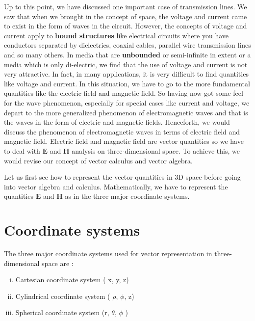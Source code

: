 Up to this point, we have discussed one important case of transmission lines. We saw that when we brought in the concept of space, the voltage and current came to exist in the form of waves in the circuit. However, the concepts of voltage and current apply to \textbf{bound structures} like electrical circuits where you have conductors separated by dielectrics, coaxial cables, parallel wire transmission lines and so many others. In media that are \textbf{unbounded} or semi-infinite in extent or a media which is only di-electric, we find that the use of voltage and current is not very attractive. In fact, in many applications, it is very difficult to find quantities like voltage and current. In this situation, we have to go to the more fundamental quantities like the electric field and magnetic field. So having now got some feel for the wave phenomenon, especially for special cases like current and voltage, we depart to the more generalized phenomenon of electromagnetic waves and that is the waves in the form of electric and magnetic fields. Henceforth, we would discuss the phenomenon of electromagnetic waves in terms of electric field and magnetic field. Electric field and magnetic field are vector quantities so we have to deal with $\boldsymbol{E}$ and $\boldsymbol{H}$ analysis on three-dimensional space. To achieve this, we would revise our concept of vector calculus and vector algebra.

Let us first see how to represent the vector quantities in 3D space before going into vector algebra and calculus. Mathematically, we have to represent the quantities $\boldsymbol{E}$ and $\boldsymbol{H}$ as  in the three major coordinate systems.

\section{Coordinate systems}
The three major coordinate systems  used for vector representation in three-dimensional space are :
\begin{enumerate}[(i)]
\item Cartesian coordinate system ( x, y, z)
\item Cylindrical coordinate system ( $\rho$, $\phi$, z)
\item Spherical coordinate system (r,  $\theta$, $\phi$ )
\end{enumerate}

